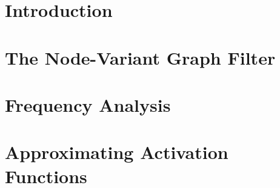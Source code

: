 \documentclass{article}
\begin{document}
\section{Introduction} \label{sec:intro}

    \vspace{-0.2cm}
\fi




\section{The Node-Variant Graph Filter} \label{sec:NVGF}




\section{Frequency Analysis} \label{sec:freq}




\section{Approximating Activation Functions} \label{sec:activation}
\end{document}
